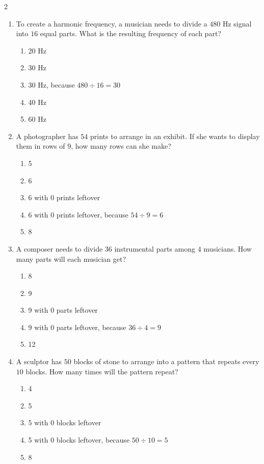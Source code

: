 \documentclass[10pt]{article}
\begin{document}
\begin{multicols}{2}
\begin{enumerate}[label=\textbf{Q\arabic*.}, leftmargin=*, itemsep=6pt, parsep=0pt]
  \item \small To create a harmonic frequency, a musician needs to divide a $480$ Hz signal into $16$ equal parts. What is the resulting frequency of each part?
  \begin{enumerate}[label=(\Alph*), leftmargin=0.6cm, nosep, itemsep=2pt]
    \item 20 Hz
    \item 30 Hz
    \item 30 Hz, because $480 \div 16 = 30$
    \item 40 Hz
    \item 60 Hz
  \end{enumerate}

  \item \small A photographer has $54$ prints to arrange in an exhibit. If she wants to display them in rows of $9$, how many rows can she make?
  \begin{enumerate}[label=(\Alph*), leftmargin=0.6cm, nosep, itemsep=2pt]
    \item 5
    \item 6
    \item 6 with 0 prints leftover
    \item 6 with 0 prints leftover, because $54 \div 9 = 6$
    \item 8
  \end{enumerate}

  \item \small A composer needs to divide $36$ instrumental parts among $4$ musicians. How many parts will each musician get?
  \begin{enumerate}[label=(\Alph*), leftmargin=0.6cm, nosep, itemsep=2pt]
    \item 8
    \item 9
    \item 9 with 0 parts leftover
    \item 9 with 0 parts leftover, because $36 \div 4 = 9$
    \item 12
  \end{enumerate}

  \item \small A sculptor has $50$ blocks of stone to arrange into a pattern that repeats every $10$ blocks. How many times will the pattern repeat?
  \begin{enumerate}[label=(\Alph*), leftmargin=0.6cm, nosep, itemsep=2pt]
    \item 4
    \item 5
    \item 5 with 0 blocks leftover
    \item 5 with 0 blocks leftover, because $50 \div 10 = 5$
    \item 8
  \end{enumerate}


\end{enumerate}
\end{multicols}
\end{document}

